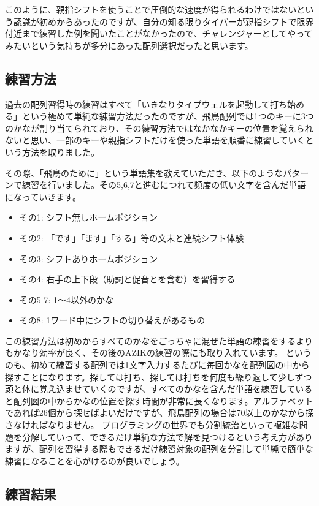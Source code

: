 このように、親指シフトを使うことで圧倒的な速度が得られるわけではないという認識が初めからあったのですが、自分の知る限りタイパーが親指シフトで限界付近まで練習した例を聞いたことがなかったので、チャレンジャーとしてやってみたいという気持ちが多分にあった配列選択だったと思います。

\subsection{練習方法}

過去の配列習得時の練習はすべて「いきなりタイプウェルを起動して打ち始める」という極めて単純な練習方法だったのですが、飛鳥配列では1つのキーに3つのかなが割り当てられており、その練習方法ではなかなかキーの位置を覚えられないと思い、一部のキーや親指シフトだけを使った単語を順番に練習していくという方法を取りました。

その際、「飛鳥のために」という単語集を教えていただき、以下のようなパターンで練習を行いました。その5,6,7と進むにつれて頻度の低い文字を含んだ単語になっていきます。
\begin{itemize}
 \item その1: シフト無しホームポジション
 \item その2: 「です」「ます」「する」等の文末と連続シフト体験
 \item その3: シフトありホームポジション
 \item その4: 右手の上下段（助詞と促音とを含む）を習得する
 \item その5-7: 1～4以外のかな
 \item その8: 1ワード中にシフトの切り替えがあるもの
\end{itemize}
この練習方法は初めからすべてのかなをごっちゃに混ぜた単語の練習をするよりもかなり効率が良く、その後のAZIKの練習の際にも取り入れています。
というのも、初めて練習する配列では1文字入力するたびに毎回かなを配列図の中から探すことになります。探しては打ち、探しては打ちを何度も繰り返して少しずつ頭と体に覚え込ませていくのですが、すべてのかなを含んだ単語を練習していると配列図の中からかなの位置を探す時間が非常に長くなります。アルファベットであれば26個から探せばよいだけですが、飛鳥配列の場合は70以上のかなから探さなければなりません。
プログラミングの世界でも分割統治といって複雑な問題を分解していって、できるだけ単純な方法で解を見つけるという考え方がありますが、配列を習得する際もできるだけ練習対象の配列を分割して単純で簡単な練習になることを心がけるのが良いでしょう。


\subsection{練習結果}

